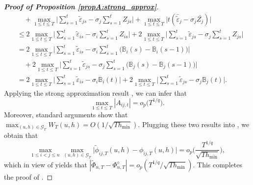 \documentclass[12pt]{article}
\makeatletter
\renewcommand{\eqref}[1]{\tagform@{\ref{#1}}}
\makeatother
\begin{document}
\begin{proof}[\textnormal{\textbf{Proof of Proposition \ref{propA:strong_approx}}}]
\begin{align*}
 & \quad + \max_{1 \le t \le T} \Big| \sum\limits_{s=1}^t \widetilde{\varepsilon}_{js} - {\sigma}_j \sum\limits_{s=1}^t Z_{js} \Big| + \max_{1 \le t \le T} \Big| t (\bar{\widetilde{\varepsilon}}_{j} -{\sigma}_j \bar{Z_j}) \Big| \\
 & \le 2 \max_{1 \le t \le T} \Big| \sum\limits_{s=1}^t \widetilde{\varepsilon}_{is} -{\sigma}_i \sum\limits_{s=1}^t Z_{is} \Big| + 2 \max_{1 \le t \le T} \Big| \sum\limits_{s=1}^t \widetilde{\varepsilon}_{js} -{\sigma}_j \sum\limits_{s=1}^t Z_{js} \Big| \\
 & = 2 \max_{1 \le t \le T} \Big| \sum\limits_{s=1}^t \widetilde{\varepsilon}_{is} - {\sigma}_i \sum\limits_{s=1}^t \big(\mathbb{B}_{i}(s) - \mathbb{B}_{i}(s-1) \big) \Big| \\
 & \quad +  2 \max_{1 \le t \le T} \Big| \sum\limits_{s=1}^t \widetilde{\varepsilon}_{js} -{\sigma}_j \sum\limits_{s=1}^t \big(\mathbb{B}_{j}(s) - \mathbb{B}_{j}(s-1) \big) \Big|\\
 & = 2 \max_{1 \le t \le T} \Big| \sum\limits_{s=1}^t \widetilde{\varepsilon}_{is} - {\sigma}_i \mathbb{B}_{i}(t) \Big| + 2 \max_{1 \le t \le T} \Big| \sum\limits_{s=1}^t \widetilde{\varepsilon}_{js} - {\sigma}_j \mathbb{B}_{j}(t) \Big|.
\end{align*}
Applying the strong approximation result \eqref{eq-strongapprox-dep}, we can infer that
\[ \max_{1 \le t \le T} |A_{ij, t}| = o_p\big(T^{1/q}\big). \]
Moreover, standard arguments show that $\max_{(u,h) \in \mathcal{G}_T} W_T(u,h) = O( 1/\sqrt{Th_{\min}} )$. Plugging these two results into \eqref{eq-strongapprox-bound3}, we obtain that 
\[ \max_{1\le i < j \le n} \max_{(u,h) \in \mathcal{G}_T} \big| \widetilde{\phi}_{ij, T}(u,h) - \phi_{ij, T}(u,h) \big| = o_p \Big( \frac{T^{1/q}}{\sqrt{Th_{\min}}} \Big), \]
which in view of \eqref{eqA:strong_approx:bound2} yields that $| \widetilde{\Phi}_{n, T} - \Phi_{n, T}^{\diamond} | = o_p( T^{1/q}/\sqrt{Th_{\min}})$. This completes the proof of \eqref{eq-strongapprox-bound-A}.



\end{proof}
\end{document}
